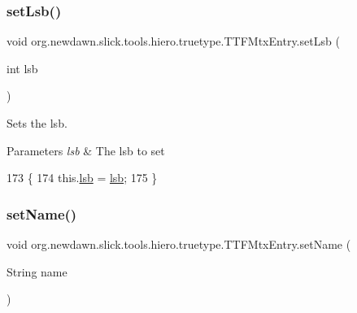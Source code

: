 \subsubsection{\texorpdfstring{set\+Lsb()}{setLsb()}}
{\footnotesize\ttfamily void org.\+newdawn.\+slick.\+tools.\+hiero.\+truetype.\+T\+T\+F\+Mtx\+Entry.\+set\+Lsb (\begin{DoxyParamCaption}\item[{int}]{lsb }\end{DoxyParamCaption})\hspace{0.3cm}{\ttfamily [inline]}}

Sets the lsb. 
\begin{DoxyParams}{Parameters}
{\em lsb} & The lsb to set \\
\hline
\end{DoxyParams}

\begin{DoxyCode}
173                                 \{
174         this.\mbox{\hyperlink{classorg_1_1newdawn_1_1slick_1_1tools_1_1hiero_1_1truetype_1_1_t_t_f_mtx_entry_aaca5842e9a52bb9d60209e558dd2f8bf}{lsb}} = \mbox{\hyperlink{classorg_1_1newdawn_1_1slick_1_1tools_1_1hiero_1_1truetype_1_1_t_t_f_mtx_entry_aaca5842e9a52bb9d60209e558dd2f8bf}{lsb}};
175     \}
\end{DoxyCode}
\mbox{\label{classorg_1_1newdawn_1_1slick_1_1tools_1_1hiero_1_1truetype_1_1_t_t_f_mtx_entry_a405a20033882ba2f8b35194351cd2853}} 
\subsubsection{\texorpdfstring{set\+Name()}{setName()}}
{\footnotesize\ttfamily void org.\+newdawn.\+slick.\+tools.\+hiero.\+truetype.\+T\+T\+F\+Mtx\+Entry.\+set\+Name (\begin{DoxyParamCaption}\item[{String}]{name }\end{DoxyParamCaption})\hspace{0.3cm}{\ttfamily [inline]}}


